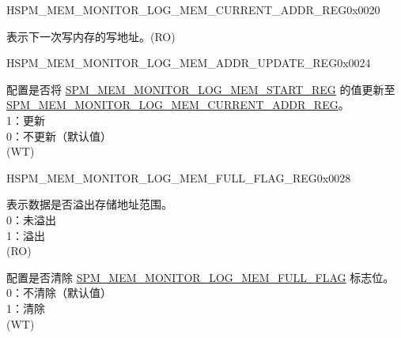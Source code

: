 \begin{register}{H}{SPM\_MEM\_MONITOR\_LOG\_MEM\_CURRENT\_ADDR\_REG}{0x0020}\label{regdesc:SPMMEMMONITORLOGMEMCURRENTADDRREG}
%
\regnewline%
\begin{regdesc}\begin{reglist}
\label{fielddesc:SPMMEMMONITORLOGMEMCURRENTADDR}\item [SPM\_MEM\_MONITOR\_LOG\_MEM\_CURRENT\_ADDR] 表示下一次写内存的写地址。(RO)
\end{reglist}\end{regdesc}
\end{register}

\begin{register}{H}{SPM\_MEM\_MONITOR\_LOG\_MEM\_ADDR\_UPDATE\_REG}{0x0024}\label{regdesc:SPMMEMMONITORLOGMEMADDRUPDATEREG}
%
%
\regnewline%
\begin{regdesc}\begin{reglist}
\label{fielddesc:SPMMEMMONITORCLRLOGMEMADDRUPDATE}\item [SPM\_MEM\_MONITOR\_LOG\_MEM\_ADDR\_UPDATE] 配置是否将 \hyperref[fielddesc:SPMMEMMONITORLOGMEMSTART]{SPM\_MEM\_MONITOR\_LOG\_MEM\_START\_REG} 的值更新至 \hyperref[fielddesc:SPMMEMMONITORLOGMEMCURRENTADDR]{SPM\_MEM\_MONITOR\_LOG\_MEM\_CURRENT\_ADDR\_REG}。\\
1：更新\\
0：不更新（默认值）\\
(WT)
\end{reglist}\end{regdesc}
\end{register}

\begin{register}{H}{SPM\_MEM\_MONITOR\_LOG\_MEM\_FULL\_FLAG\_REG}{0x0028}\label{regdesc:SPMMEMMONITORLOGMEMFULLFLAGREG}
%
%
%
\regnewline%
\begin{regdesc}\begin{reglist}
\label{fielddesc:SPMMEMMONITORLOGMEMFULLFLAG}\item [SPM\_MEM\_MONITOR\_LOG\_MEM\_FULL\_FLAG] 表示数据是否溢出存储地址范围。\\
0：未溢出\\
1：溢出\\
(RO)
\label{fielddesc:SPMMEMMONITORCLRLOGMEMFULLFLAG}\item [SPM\_MEM\_MONITOR\_CLR\_LOG\_MEM\_FULL\_FLAG] 配置是否清除 \hyperref[fielddesc:SPMMEMMONITORLOGMEMFULLFLAG]{SPM\_MEM\_MONITOR\_LOG\_MEM\_FULL\_FLAG} 标志位。\\
0：不清除（默认值）\\
1：清除\\
(WT)
\end{reglist}\end{regdesc}
\end{register}

